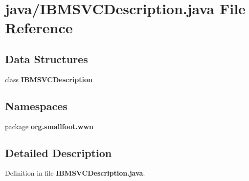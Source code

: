 \section{java/\-I\-B\-M\-S\-V\-C\-Description.java \-File \-Reference}
\label{IBMSVCDescription_8java}
\subsection*{\-Data \-Structures}
\begin{DoxyCompactItemize}
\item 
class {\bf \-I\-B\-M\-S\-V\-C\-Description}
\end{DoxyCompactItemize}
\subsection*{\-Namespaces}
\begin{DoxyCompactItemize}
\item 
package {\bf org.\-smallfoot.\-wwn}
\end{DoxyCompactItemize}


\subsection{\-Detailed \-Description}


\-Definition in file {\bf \-I\-B\-M\-S\-V\-C\-Description.\-java}.

